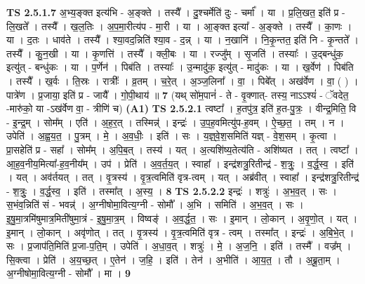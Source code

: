 \documentclass[17pt]{extarticle}
\begin{document}
                  \newline
                                \textbf{ TS 2.5.1.7} \newline
                  अ॒भ्य॒ङ्क्त इत्य॑भि - अ॒ङ्क्ते । तस्यै᳚ । दु॒श्चर्मेति॑ दुः - चर्मा᳚ । या । प्र॒लि॒खत॒ इति॑ प्र - लि॒खते᳚ । तस्यै᳚ । ख॒ल॒तिः । अ॒प॒मा॒रीत्य॑प - मा॒री । या । आ॒ङ्क्त इत्या᳚ - अ॒ङ्क्ते । तस्यै᳚ । का॒णः । या । द॒तः । धाव॑ते । तस्यै᳚ । श्या॒वद॒न्निति॑ श्या॒व - द॒न्न् । या । न॒खानि॑ । नि॒कृ॒न्तत॒ इति॑ नि - कृ॒न्तते᳚ । तस्यै᳚ । कु॒न॒खी । या । कृ॒णत्ति॑ । तस्यै᳚ । क्ली॒बः । या । रज्जु᳚म् । सृ॒जति॑ । तस्याः᳚ । उ॒द्बन्धु॑क॒ इत्यु॑त् - बन्धु॑कः । या । प॒र्णेन॑ । पिब॑ति । तस्याः᳚ । उ॒न्मादु॑क॒ इत्यु॑त् - मादु॑कः । या । ख॒र्वेण॑ । पिब॑ति । तस्यै᳚ । ख॒र्वः । ति॒स्रः । रात्रीः᳚ । व्र॒तम् । च॒रे॒त् । अ॒ञ्ज॒लिना᳚ । वा॒ । पिबे᳚त् । अख॑र्वेण । वा॒ ( ) । पात्रे॑ण । प्र॒जाया॒ इति॑ प्र - जायै᳚ । गो॒पी॒थाय॑ ॥ \textbf{  7} \newline
                  \newline
                      (यथ् सो॑म॒पानं॑ - ते - वृ॒क्णात्- तस्य॒ नाऽऽश्यं॑ - ॅवदेत॒ -मारु॑को॒ या -ऽख॑र्वेण वा॒ - त्रीणि॑ च)  \textbf{(A1)} \newline \newline
                                \textbf{ TS 2.5.2.1} \newline
                  त्वष्टा᳚ । ह॒तपु॑त्र॒ इति॑ ह॒त-पु॒त्रः॒ । वीन्द्र॒मिति॒ वि - इ॒न्द्र॒म् । सोम᳚म् । एति॑ । अ॒ह॒र॒त् । तस्मिन्न्॑ । इन्द्रः॑ । उ॒प॒ह॒वमित्यु॑प-ह॒वम् । ऐ॒च्छ॒त॒ । तम् । न । उपेति॑ । अ॒ह्व॒य॒त॒ । पु॒त्रम् । मे॒ । अ॒व॒धीः॒ । इति॑ । सः । य॒ज्ञ्॒वे॒श॒समिति॑ यज्ञ् - वे॒श॒सम् । कृ॒त्वा । प्रा॒सहेति॑ प्र - सहा᳚ । सोम᳚म् । अ॒पि॒ब॒त् । तस्य॑ । यत् । अ॒त्यशि॑ष्य॒तेत्य॑ति - अशि॑ष्यत । तत् । त्वष्टा᳚ । आ॒ह॒व॒नीय॒मित्या᳚-ह॒व॒नीय᳚म् । उप॑ । प्रेति॑ । अ॒व॒र्त॒य॒त् । स्वाहा᳚ । इन्द्र॑शत्रु॒रितीन्द्र॑ - श॒त्रुः॒ । व॒र्द्ध॒स्व॒ । इति॑ । यत् । अव॑र्तयत् । तत् । वृ॒त्रस्य॑ । वृ॒त्र॒त्वमिति॑ वृत्र-त्वम् । यत् । अब्र॑वीत् । स्वाहा᳚ । इन्द्र॑शत्रु॒रितीन्द्र॑ - श॒त्रुः॒ । व॒र्द्ध॒स्व॒ । इति॑ । तस्मा᳚त् । अ॒स्य॒ । \textbf{  8} \newline
                  \newline
                                \textbf{ TS 2.5.2.2} \newline
                  इन्द्रः॑ । शत्रुः॑ । अ॒भ॒व॒त् । सः । स॒भंव॒न्निति॑ सं - भवन्न्॑ । अ॒ग्नीषोमा॒वित्य॒ग्नी - सोमौ᳚ । अ॒भि । समिति॑ । अ॒भ॒व॒त् । सः । इ॒षु॒मा॒त्रमि॑षुमात्र॒मिती॑षुमा॒त्रं - इ॒षु॒मा॒त्र॒म् । विष्वङ्॑ । अ॒व॒र्द्ध॒त॒ । सः । इ॒मान् । लो॒कान् । अ॒वृ॒णो॒त् । यत् । इ॒मान् । लो॒कान् । अवृ॑णोत् । तत् । वृ॒त्रस्य॑ । वृ॒त्र॒त्वमिति॑ वृत्र - त्वम् । तस्मा᳚त् । इन्द्रः॑ । अ॒बि॒भे॒त् । सः । प्र॒जाप॑ति॒मिति॑ प्र॒जा-प॒ति॒म् । उपेति॑ । अ॒धा॒व॒त् । शत्रुः॑ । मे॒ । अ॒ज॒नि॒ । इति॑ । तस्मै᳚ । वज्र᳚म् । सि॒क्त्वा । प्रेति॑ । अ॒य॒च्छ॒त् । ए॒तेन॑ । ज॒हि॒ । इति॑ । तेन॑ । अ॒भीति॑ । आ॒य॒त॒ । तौ । अ॒ब्रू॒ता॒म् । अ॒ग्नीषोमा॒वित्य॒ग्नी - सोमौ᳚ । मा । \textbf{  9} \newline
\end{document}
